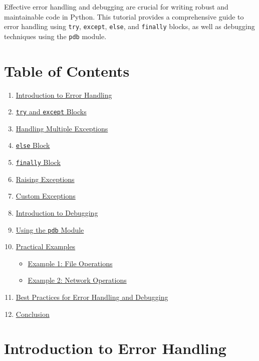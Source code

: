 \documentclass[
  letterpaper,
  DIV=11,
  numbers=noendperiod]{scrreprt}
\providecommand{\tightlist}{%
  \setlength{\itemsep}{0pt}\setlength{\parskip}{0pt}}\usepackage{longtable,booktabs,array}
\begin{document}
Effective error handling and debugging are crucial for writing robust
and maintainable code in Python. This tutorial provides a comprehensive
guide to error handling using \texttt{try}, \texttt{except},
\texttt{else}, and \texttt{finally} blocks, as well as debugging
techniques using the \texttt{pdb} module.

\section{Table of Contents}\label{table-of-contents-5}

\begin{enumerate}
\def\labelenumi{\arabic{enumi}.}
\tightlist
\item
  \hyperref[introduction-to-error-handling]{Introduction to Error
  Handling}
\item
  \hyperref[try-and-except-blocks]{\texttt{try} and \texttt{except}
  Blocks}
\item
  \hyperref[handling-multiple-exceptions]{Handling Multiple Exceptions}
\item
  \hyperref[else-block]{\texttt{else} Block}
\item
  \hyperref[finally-block]{\texttt{finally} Block}
\item
  \hyperref[raising-exceptions]{Raising Exceptions}
\item
  \hyperref[custom-exceptions]{Custom Exceptions}
\item
  \hyperref[introduction-to-debugging]{Introduction to Debugging}
\item
  \hyperref[using-the-pdb-module]{Using the \texttt{pdb} Module}
\item
  \hyperref[practical-examples]{Practical Examples}

  \begin{itemize}
  \tightlist
  \item
    \hyperref[example-1-file-operations]{Example 1: File Operations}
  \item
    \hyperref[example-2-network-operations]{Example 2: Network
    Operations}
  \end{itemize}
\item
  \hyperref[best-practices-for-error-handling-and-debugging]{Best
  Practices for Error Handling and Debugging}
\item
  \hyperref[conclusion]{Conclusion}
\end{enumerate}

\section{Introduction to Error
Handling}\label{introduction-to-error-handling}
\end{document}
